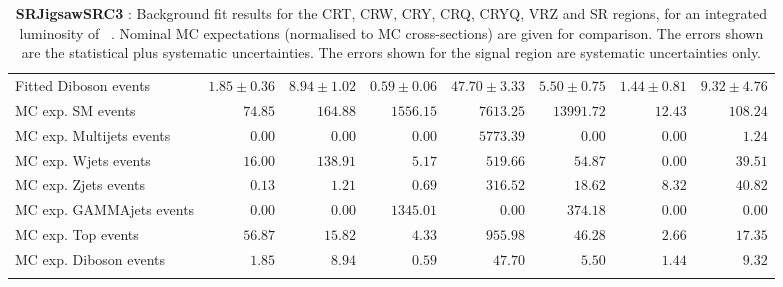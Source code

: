 \begin{table}
\begin{center}
{\begin{tabular*}{\textwidth}{@{\extracolsep{\fill}}lrrrrrrr}
        Fitted Diboson events         & $1.85 \pm 0.36$          & $8.94 \pm 1.02$          & $0.59 \pm 0.06$          & $47.70 \pm 3.33$          & $5.50 \pm 0.75$          & $1.44 \pm 0.81$          & $9.32 \pm 4.76$              \\
 \noalign{\smallskip}\hline\noalign{\smallskip}
MC exp. SM events              & $74.85$          & $164.88$          & $1556.15$          & $7613.25$          & $13991.72$          & $12.43$          & $108.24$              \\
\noalign{\smallskip}\hline\noalign{\smallskip}
        MC exp. Multijets events         & $0.00$          & $0.00$          & $0.00$          & $5773.39$          & $0.00$          & $0.00$          & $1.24$              \\
        MC exp. Wjets events         & $16.00$          & $138.91$          & $5.17$          & $519.66$          & $54.87$          & $0.00$          & $39.51$              \\
        MC exp. Zjets events         & $0.13$          & $1.21$          & $0.69$          & $316.52$          & $18.62$          & $8.32$          & $40.82$              \\
        MC exp. GAMMAjets events         & $0.00$          & $0.00$          & $1345.01$          & $0.00$          & $374.18$          & $0.00$          & $0.00$              \\
        MC exp. Top events         & $56.87$          & $15.82$          & $4.33$          & $955.98$          & $46.28$          & $2.66$          & $17.35$              \\
        MC exp. Diboson events         & $1.85$          & $8.94$          & $0.59$          & $47.70$          & $5.50$          & $1.44$          & $9.32$              \\
\noalign{\smallskip}\hline\noalign{\smallskip}
\end{tabular*}
}
\end{center}
\caption{{\bf SRJigsawSRC3} : Background fit results for the CRT, CRW, CRY, CRQ, CRYQ, VRZ and SR regions, for an integrated luminosity of \ourintlumi~\ifb. Nominal MC expectations (normalised to MC cross-sections) are given for comparison. The errors shown are the statistical plus systematic uncertainties. The errors shown for the signal region are systematic uncertainties only.}
\label{table.results.systematics.in.logL.fit.CRT.CRW.CRY.CRQ.CRYQ.VRZ.SR.SRJigsawSRC3}
\end{table}
%